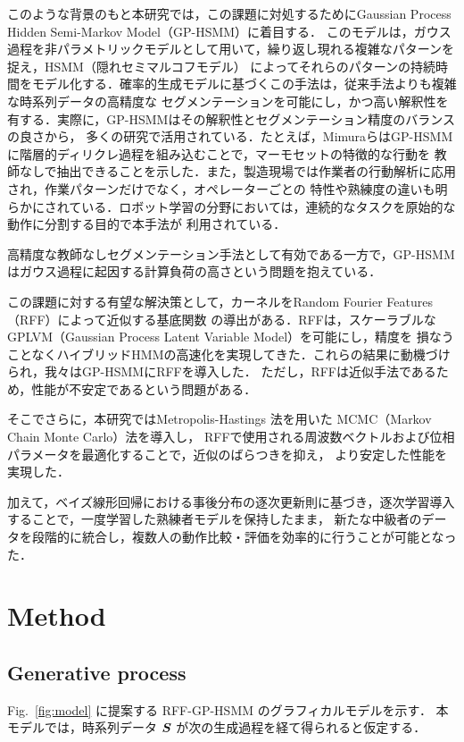 \documentclass[conference]{IEEEtran}
\begin{document}
このような背景のもと本研究では，この課題に対処するためにGaussian Process Hidden Semi-Markov Model（GP-HSMM）\cite{Nakamura2017}に着目する．
このモデルは，ガウス過程を非パラメトリックモデルとして用いて，繰り返し現れる複雑なパターンを捉え，HSMM（隠れセミマルコフモデル）
によってそれらのパターンの持続時間をモデル化する．確率的生成モデルに基づくこの手法は，従来手法よりも複雑な時系列データの高精度な
セグメンテーションを可能にし，かつ高い解釈性を有する．実際に，GP-HSMMはその解釈性とセグメンテーション精度のバランスの良さから，
多くの研究で活用されている．たとえば，MimuraらはGP-HSMMに階層的ディリクレ過程を組み込むことで，マーモセットの特徴的な行動を
教師なしで抽出できることを示した\cite{Mimura2024}．また，製造現場では作業者の行動解析に応用され，作業パターンだけでなく，オペレーターごとの
特性や熟練度の違いも明らかにされている\cite{Saito2023a}．ロボット学習の分野においては，連続的なタスクを原始的な動作に分割する目的で本手法が
利用されている\cite{Mo2023}．

高精度な教師なしセグメンテーション手法として有効である一方で，GP-HSMMはガウス過程に起因する計算負荷の高さという問題を抱えている．

この課題に対する有望な解決策として，カーネルをRandom Fourier Features（RFF）によって近似する基底関数
の導出がある\cite{Rahimi2007}．RFFは，スケーラブルなGPLVM（Gaussian Process Latent Variable Model）\cite{Zhang2023}\cite{Li2024}を可能にし，精度を
損なうことなくハイブリッドHMMの高速化を実現してきた\cite{Jung2020}．これらの結果に動機づけられ，我々はGP-HSMMにRFFを導入した．
ただし，RFFは近似手法であるため，性能が不安定であるという問題がある．

そこでさらに，本研究ではMetropolis-Hastings 法を用いた MCMC（Markov Chain Monte Carlo）法\cite{Hastings1970}を導入し，
RFFで使用される周波数ベクトルおよび位相パラメータを最適化することで，近似のばらつきを抑え，
より安定した性能を実現した．

加えて，ベイズ線形回帰における事後分布の逐次更新則に基づき，逐次学習\cite{Broderick2013}導入することで，一度学習した熟練者モデルを保持したまま，
新たな中級者のデータを段階的に統合し，複数人の動作比較・評価を効率的に行うことが可能となった．

\section{Method}

\subsection{Generative process}\label{AA}
Fig.~\ref{fig:model} に提案する RFF-GP-HSMM のグラフィカルモデルを示す．  
本モデルでは，時系列データ ${ \boldsymbol S}$ が次の生成過程を経て得られると仮定する．
\end{document}

